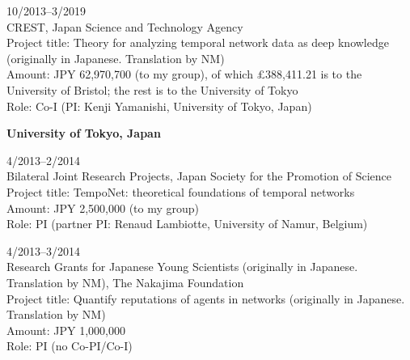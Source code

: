 \documentclass[11pt,letter]{article}
\renewenvironment{itemize}{
  \begin{list}{}{
    \setlength{\leftmargin}{1.5em}
    \setlength{\itemsep}{0.25em}
    \setlength{\parskip}{0pt}
    \setlength{\parsep}{0.25em}
  }
}{
  \end{list}
}
\begin{document}
\begin{itemize}
\item
10/2013--3/2019\\
CREST, Japan Science and Technology Agency\\
Project title: Theory for analyzing temporal network data as deep knowledge (originally in Japanese. Translation by NM)\\
Amount: JPY 62,970,700 (to my group), of which \pounds 388,411.21 is to the University of Bristol; the rest is to the University of Tokyo\\
Role: Co-I (PI: Kenji Yamanishi, University of Tokyo, Japan)
% 
%
%

\item \textbf{University of Tokyo, Japan}

\item
4/2013--2/2014\\
Bilateral Joint Research Projects, Japan Society for the Promotion of Science\\
Project title: TempoNet: theoretical foundations of temporal networks\\
Amount: JPY 2,500,000 (to my group)\\
Role: PI (partner PI: Renaud Lambiotte, University of Namur, Belgium)

\item
4/2013--3/2014\\
Research Grants for Japanese Young Scientists (originally in Japanese. Translation by NM), The Nakajima Foundation\\
Project title: Quantify reputations of agents in networks (originally in Japanese. Translation by NM)\\
Amount: JPY 1,000,000\\
Role: PI (no Co-PI/Co-I)


\end{itemize}
\end{document}
